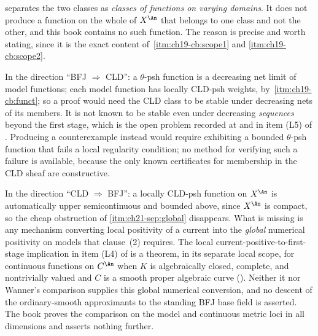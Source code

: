 \begin{remark}
\label{rem:ch21-no-separating-example}
 separates the two classes as \emph{classes of
functions on varying domains}.  It does not produce a function on the whole
of \(X^{\An}\) that belongs to one class and not the other, and this book
contains no such function.  The reason is precise and worth stating, since
it is the exact content of
\,\cref{itm:ch19-cb:scope1} and
\cref{itm:ch19-cb:scope2}.

In the direction ``BFJ \(\Rightarrow\) CLD'': a \(\theta\)-psh function is a
decreasing net limit of model functions; each model function has locally
CLD-psh weights, by
\,\cref{itm:ch19-cb:funct}; so a proof
would need the CLD class to be stable under decreasing nets of its members.
It is not known to be stable even under decreasing \emph{sequences} beyond
the first stage, which is the open problem recorded at
 and in item (L5) of
.  Producing a counterexample instead would
require exhibiting a bounded \(\theta\)-psh function that fails a local
regularity condition; no method for verifying such a failure is available,
because the only known certificates for membership in the CLD sheaf are
constructive.

In the direction ``CLD \(\Rightarrow\) BFJ'': a locally CLD-psh function on
\(X^{\An}\) is automatically upper semicontinuous and bounded above, since
\(X^{\An}\) is compact, so the cheap obstruction of
\cref{itm:ch21-sep:global} disappears.  What is missing is any mechanism
converting local positivity of a current into the \emph{global} numerical
positivity on models that clause~(2) requires.  The local
current-positive-to-first-stage implication in item (L4) of
 is a theorem, in its separate local scope,
for continuous functions on $C^{\An}$ when $K$ is algebraically closed,
complete, and nontrivially valued and $C$ is a smooth proper algebraic curve
().  Neither it nor
Wanner's comparison supplies this global numerical conversion, and no
descent of the ordinary-smooth approximants to the standing BFJ base field
is asserted.  The book proves the comparison on the model and continuous
metric loci in all dimensions and asserts nothing further.
\end{remark}

